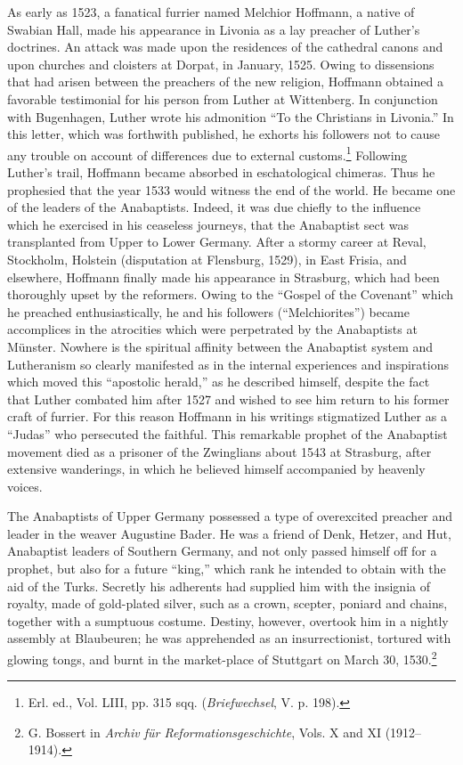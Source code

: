 As early as 1523, a fanatical furrier named Melchior Hoffmann,
a native of Swabian Hall, made his appearance in Livonia as a lay
preacher of Luther’s doctrines. An attack was made upon the residences
of the cathedral canons and upon churches and cloisters at
Dorpat, in January, 1525. Owing to dissensions that had arisen between
the preachers of the new religion, Hoffmann obtained a favorable testimonial
for his person from Luther at Wittenberg. In conjunction with Bugenhagen,
Luther wrote his admonition “To the
Christians in Livonia.” In this letter, which was forthwith published,
he exhorts his followers not to cause any trouble on account of differences
due to external customs.\footnote{Erl. ed., Vol. LIII, pp. 315 sqq. (\textit{Briefwechsel}, V. p. 198).}
Following Luther’s trail, Hoffmann
became absorbed in eschatological chimeras. Thus he prophesied that
the year 1533 would witness the end of the world. He became one
of the leaders of the Anabaptists. Indeed, it was due chiefly to the
influence which he exercised in his ceaseless journeys, that the Anabaptist
sect was transplanted from Upper to Lower Germany. After
a stormy career at Reval, Stockholm, Holstein (disputation at Flensburg,
1529), in East Frisia, and elsewhere, Hoffmann finally made
his appearance in Strasburg, which had been thoroughly upset by the
reformers. Owing to the “Gospel of the Covenant” which he preached
enthusiastically, he and his followers (“Melchiorites”) became accomplices
in the atrocities which were perpetrated by the Anabaptists
at Münster. Nowhere is the spiritual affinity between the Anabaptist
system and Lutheranism so clearly manifested as in the internal experiences
and inspirations which moved this “apostolic herald,” as he
described himself, despite the fact that Luther combated him after
1527 and wished to see him return to his former craft of furrier. For
this reason Hoffmann in his writings stigmatized Luther as a “Judas”
who persecuted the faithful. This remarkable prophet of the Anabaptist
movement died as a prisoner of the Zwinglians about 1543 at Strasburg,
after extensive wanderings, in which he believed himself accompanied by
heavenly voices.

The Anabaptists of Upper Germany possessed a type of overexcited preacher
and leader in the weaver Augustine Bader. He was a
friend of Denk, Hetzer, and Hut, Anabaptist leaders of Southern
Germany, and not only passed himself off for a prophet, but also for
a future “king,” which rank he intended to obtain with the aid of
the Turks. Secretly his adherents had supplied him with the insignia
of royalty, made of gold-plated silver, such as a crown, scepter,
poniard and chains, together with a sumptuous costume. Destiny,
however, overtook him in a nightly assembly at Blaubeuren; he was
apprehended as an insurrectionist, tortured with glowing tongs, and
burnt in the market-place of Stuttgart on March 30, 1530.\footnote
{G. Bossert in \textit{Archiv für Reformationsgeschichte}, Vols. X and XI (1912--1914).}

